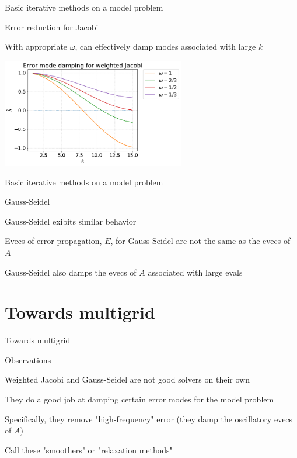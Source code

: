 \documentclass[18pt,xcolor=table]{beamer}
\begin{document}
\begin{frame}{Basic iterative methods on a model problem}
\begin{center}
\begin{block}{Error reduction for Jacobi}
\bit
\item With appropriate $\omega$, can effectively damp modes associated with large $k$
\eit
\end{block}
\includegraphics[width=0.6\textwidth]{../figures/weightedJacobiModeDamping}
\end{center}
\end{frame}

\begin{frame}{Basic iterative methods on a model problem}
\begin{block}{Gauss-Seidel}
\bit
\item Gauss-Seidel exibits similar behavior
\item Evecs of error propagation, $E$, for Gauss-Seidel are not the same as the evecs of $A$
\item Gauss-Seidel also damps the evecs of $A$ associated with large evals
\eit
\end{block}
\end{frame}


\section{Towards multigrid}

\begin{frame}{Towards multigrid}
\begin{block}{Observations}
\bit
\item Weighted Jacobi and Gauss-Seidel are not good solvers on their own
\item They do a good job at damping certain error modes for the model problem
\item Specifically, they remove "high-frequency" error (they damp the oscillatory evecs of $A$)
\item Call these "smoothers" or "relaxation methods"
\eit
\end{block}
\end{frame}
\end{document}
